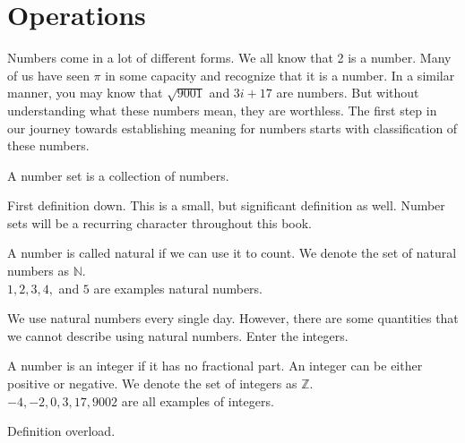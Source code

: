 \chapter{Operations}

Numbers come in a lot of different forms. We all know that 2 is a number. Many of us have seen $\pi$ in some capacity and recognize that it is a number. In a similar manner, you may know that $\sqrt{9001}$ and $3i + 17$ are numbers. But without understanding what these numbers mean, they are worthless. The first step in our journey towards establishing meaning for numbers starts with classification of these numbers.

\begin{boxdefn}
	A number set is a collection of numbers.
\end{boxdefn}

First definition down. This is a small, but significant definition as well. Number sets will be a recurring character throughout this book. 

\begin{boxdefn}
	A number is called natural if we can use it to count. We denote the set of natural numbers as $\mathbb{N}$. \\ $1,2,3,4,$ and $5$ are examples natural numbers.
\end{boxdefn}

We use natural numbers every single day. However, there are some quantities that we cannot describe using natural numbers. Enter the integers.

\begin{boxdefn}[Integer]
	A number is an integer if it has no fractional part. An integer can be either positive or negative. We denote the set of integers as $\mathbb{Z}$. \\$-4, -2, 0, 3,17,  9002$ are all examples of integers. 
\end{boxdefn}


Definition overload. 
